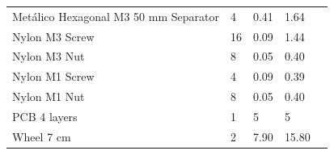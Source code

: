 \begin{table}[H]
{\begin{turn}{90}
\begin{tabular}{|l|l|l|l|l}
		Metálico Hexagonal M3 50 mm Separator                           & 4                                         & 0.41                                                                                                                & 1.64                                                                                                             &  \\ \cline{1-4}
		Nylon M3 Screw                                               & 16                                        & 0.09                                                                                                                & 1.44                                                                                                             &  \\ \cline{1-4}
		Nylon M3 Nut                                                 & 8                                         & 0.05                                                                                                                & 0.40                                                                                                             &  \\ \cline{1-4}
		Nylon M1 Screw                                               & 4                                         & 0.09                                                                                                                & 0.39                                                                                                             &  \\ \cline{1-4}
		Nylon M1 Nut                                                 & 8                                         & 0.05                                                                                                                & 0.40                                                                                                             &  \\ \cline{1-4}
		PCB 4 layers                               & 1                                         & 5                                                                                                                   & 5                                                                                                                &  \\ \cline{1-4}
		Wheel 7 cm                                                      & 2                                         & 7.90                                                                                                                & 15.80                                                                                                            &  \\ \cline{1-4}

\end{tabular}
\end{turn}}
\end{table}

